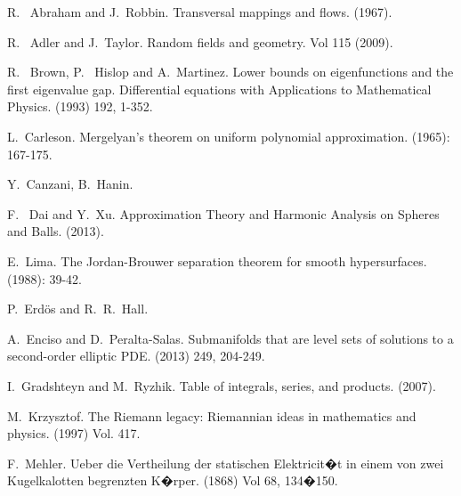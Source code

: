 \documentclass[11pt,reqno]{amsart}
\theoremstyle{definition}
\begin{document}
\begin{thebibliography}{1}


 R.~ Abraham and J.~Robbin.
\newblock Transversal mappings and flows.
 (1967).

 R.~ Adler and J.~Taylor.
\newblock Random fields and geometry.
 Vol 115 (2009).

 R.~ Brown, P.~ Hislop and A.~Martinez. 
\newblock Lower bounds on eigenfunctions and the first eigenvalue gap. 
\newblock Differential equations with Applications to Mathematical Physics. 
 (1993) 192, 1-352.



 L.~Carleson.
\newblock Mergelyan's theorem on uniform polynomial approximation.
  (1965): 167-175.

Y.~Canzani, B.~Hanin. 


 F.~ Dai and Y.~Xu.
\newblock Approximation Theory and Harmonic Analysis on Spheres and Balls.
 (2013).

 E.~Lima.
\newblock The Jordan-Brouwer separation theorem for smooth hypersurfaces.
  (1988): 39-42.

P.~Erd\"{o}s and R.~R.~Hall.


 A.~Enciso and D.~Peralta-Salas.
\newblock Submanifolds that are level sets of solutions to a second-order elliptic PDE.
 (2013) 249, 204-249.


 I.~Gradshteyn and M.~Ryzhik.
\newblock Table of integrals, series, and products. 
 (2007).

 M.~Krzysztof.
\newblock The Riemann legacy: Riemannian ideas in mathematics and physics.
 (1997) Vol. 417.


 F.~Mehler.
\newblock Ueber die Vertheilung der statischen Elektricit�t in einem von zwei Kugelkalotten begrenzten K�rper.
 (1868) Vol 68, 134�150.




\end{thebibliography}
\end{document}
